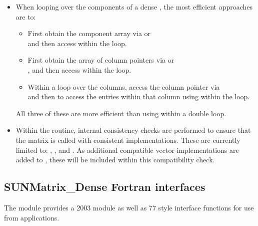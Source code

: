 \begin{itemize}
                                        
\item
  When looping over the components of a dense  ,
  the most efficient approaches are to:
  \begin{itemize}
    \item First obtain the component array via  or\\
     and then
    access  within the loop.
  
    \item First obtain the array of column pointers via  or\\
    , and then
    access  within the loop. 
  
    \item Within a loop over the columns, access the column pointer via\\
     and then to access the
    entries within that column using  within the loop.
  \end{itemize}
  All three of these are more efficient than
  using  within a double loop.

\item
  {\warn} Within the  routine, internal
  consistency checks are performed to ensure that the matrix is called
  with consistent {\nvector} implementations.  These are currently
  limited to: {\nvecs}, {\nvecopenmp}, and {\nvecpthreads}.  As additional
  compatible vector implementations are added to {\sundials}, these
  will be included within this compatibility check.

\end{itemize}



\subsection{SUNMatrix\_Dense Fortran interfaces}
\label{ss:sunmat_dense_fortran}

The {\sunmatdense} module provides a {\F} 2003 module as well as {\F} 77
style interface functions for use from {\F} applications.

